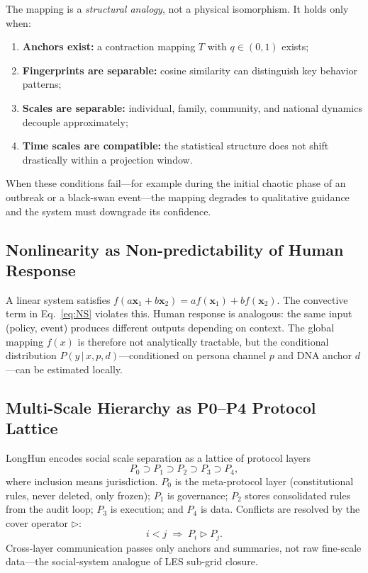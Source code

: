 \documentclass[10pt,a4paper]{article}
\theoremstyle{definition}
\begin{document}
The mapping is a \emph{structural analogy}, not a physical isomorphism. It holds only when:
\begin{enumerate}
\item \textbf{Anchors exist:} a contraction mapping $T$ with $q\in(0,1)$ exists;
\item \textbf{Fingerprints are separable:} cosine similarity can distinguish key behavior patterns;
\item \textbf{Scales are separable:} individual, family, community, and national dynamics decouple approximately;
\item \textbf{Time scales are compatible:} the statistical structure does not shift drastically within a projection window.
\end{enumerate}
When these conditions fail---for example during the initial chaotic phase of an outbreak or a black-swan event---the mapping degrades to qualitative guidance and the system must downgrade its confidence.

\subsection{Nonlinearity as Non-predictability of Human Response}

A linear system satisfies $f(a\mathbf{x}_1+b\mathbf{x}_2)=af(\mathbf{x}_1)+bf(\mathbf{x}_2)$. The convective term in Eq.~\eqref{eq:NS} violates this. Human response is analogous: the same input (policy, event) produces different outputs depending on context. The global mapping $f(x)$ is therefore not analytically tractable, but the conditional distribution $P(y\,|\,x,p,d)$---conditioned on persona channel $p$ and DNA anchor $d$---can be estimated locally.

\subsection{Multi-Scale Hierarchy as P0--P4 Protocol Lattice}

LongHun encodes social scale separation as a lattice of protocol layers
\begin{equation}\label{eq:P-chain}
P_0 \supset P_1 \supset P_2 \supset P_3 \supset P_4,
\end{equation}
where inclusion means jurisdiction. $P_0$ is the meta-protocol layer (constitutional rules, never deleted, only frozen); $P_1$ is governance; $P_2$ stores consolidated rules from the audit loop; $P_3$ is execution; and $P_4$ is data. Conflicts are resolved by the cover operator $\triangleright$:
\begin{equation}\label{eq:cover}
i < j \;\Longrightarrow\; P_i \triangleright P_j.
\end{equation}
Cross-layer communication passes only anchors and summaries, not raw fine-scale data---the social-system analogue of LES sub-grid closure.
\end{document}
